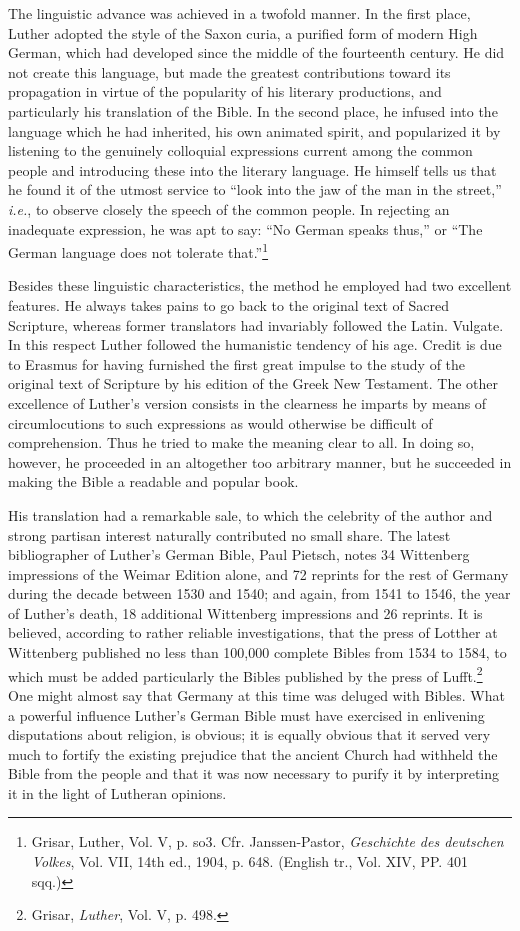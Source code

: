 The linguistic advance was achieved in a twofold manner. In the
first place, Luther adopted the style of the Saxon curia, a purified
form of modern High German, which had developed since the middle
of the fourteenth century. He did not create this language, but made
the greatest contributions toward its propagation in virtue of the
popularity of his literary productions, and particularly his translation
of the Bible. In the second place, he infused into the language which
he had inherited, his own animated spirit, and popularized it by
listening to the genuinely colloquial expressions current among the
common people and introducing these into the literary language. He
himself tells us that he found it of the utmost service to “look into
the jaw of the man in the street,” \textit{i.e.}, to observe closely the speech
of the common people. In rejecting an inadequate expression, he was
apt to say: “No German speaks thus,” or “The German language
does not tolerate that.”\footnote
{Grisar, Luther, Vol. V, p. so3. Cfr. Janssen-Pastor, \textit{Geschichte des deutschen Volkes},
Vol. VII, 14th ed., 1904, p. 648. (English tr., Vol. XIV, PP. 401 sqq.)}

Besides these linguistic characteristics, the method he employed had
two excellent features. He always takes pains to go back to the
original text of Sacred Scripture, whereas former translators had
invariably followed the Latin. Vulgate. In this respect Luther followed
the humanistic tendency of his age. Credit is due to Erasmus
for having furnished the first great impulse to the study of the
original text of Scripture by his edition of the Greek New Testament.
The other excellence of Luther’s version consists in the clearness he
imparts by means of circumlocutions to such expressions as would
otherwise be difficult of comprehension. Thus he tried to make the
meaning clear to all. In doing so, however, he proceeded in an altogether
too arbitrary manner, but he succeeded in making the Bible a
readable and popular book.

His translation had a remarkable sale, to which the celebrity of
the author and strong partisan interest naturally contributed no small
share. The latest bibliographer of Luther’s German Bible, Paul Pietsch,
notes 34 Wittenberg impressions of the Weimar Edition alone, and
72 reprints for the rest of Germany during the decade between 1530
and 1540; and again, from 1541 to 1546, the year of Luther’s death,
18 additional Wittenberg impressions and 26 reprints. It is believed,
according to rather reliable investigations, that the press of Lotther
at Wittenberg published no less than 100,000 complete Bibles from
1534 to 1584, to which must be added particularly the Bibles published
by the press of Lufft.\footnote{Grisar, \textit{Luther}, Vol. V, p. 498.}
One might almost say that Germany
at this time was deluged with Bibles. What a powerful influence
Luther’s German Bible must have exercised in enlivening disputations
about religion, is obvious; it is equally obvious that it served
very much to fortify the existing prejudice that the ancient Church
had withheld the Bible from the people and that it was now necessary
to purify it by interpreting it in the light of Lutheran opinions.

